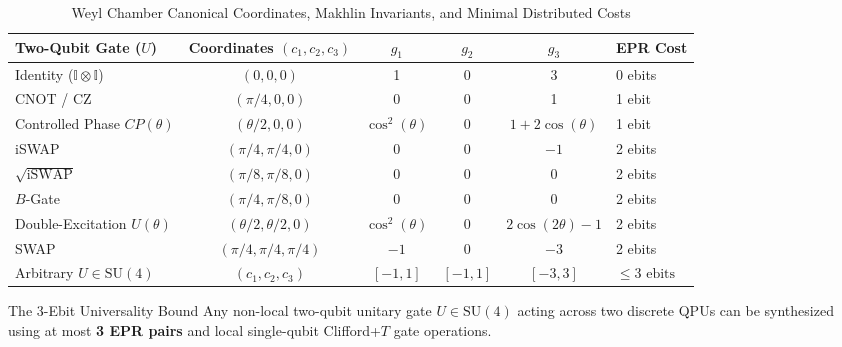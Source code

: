 \begin{table}[htbp]
\centering
\small
\caption{Weyl Chamber Canonical Coordinates, Makhlin Invariants, and Minimal Distributed Costs}
\label{tab:weyl_coordinates_cost}
\begin{tabularx}{\textwidth}{p{3.6cm} c c c c X}
\toprule
\textbf{Two-Qubit Gate ($U$)} & \textbf{Coordinates $(c_1, c_2, c_3)$} & \textbf{$g_1$} & \textbf{$g_2$} & \textbf{$g_3$} & \textbf{EPR Cost} \\
\midrule
Identity ($\mathbb{I} \otimes \mathbb{I}$) & $(0, 0, 0)$ & 1 & 0 & 3 & 0 ebits \\
CNOT / CZ & $(\pi/4, 0, 0)$ & 0 & 0 & 1 & 1 ebit \\
Controlled Phase $CP(\theta)$ & $(\theta/2, 0, 0)$ & $\cos^2(\theta)$ & 0 & $1 + 2\cos(\theta)$ & 1 ebit \\
iSWAP & $(\pi/4, \pi/4, 0)$ & 0 & 0 & $-1$ & 2 ebits \\
$\sqrt{\text{iSWAP}}$ & $(\pi/8, \pi/8, 0)$ & 0 & 0 & 0 & 2 ebits \\
$B$-Gate & $(\pi/4, \pi/8, 0)$ & 0 & 0 & 0 & 2 ebits \\
Double-Excitation $U(\theta)$ & $(\theta/2, \theta/2, 0)$ & $\cos^2(\theta)$ & 0 & $2\cos(2\theta)-1$ & 2 ebits \\
SWAP & $(\pi/4, \pi/4, \pi/4)$ & $-1$ & 0 & $-3$ & 2 ebits \\
Arbitrary $U \in \text{SU}(4)$ & $(c_1, c_2, c_3)$ & $[-1, 1]$ & $[-1, 1]$ & $[-3, 3]$ & $\le 3\text{ ebits}$ \\
\bottomrule
\end{tabularx}
\end{table}

\begin{theorembox}{The 3-Ebit Universality Bound}
Any non-local two-qubit unitary gate $U \in \text{SU}(4)$ acting across two discrete QPUs can be synthesized using at most \textbf{3 EPR pairs} and local single-qubit Clifford+$T$ gate operations.
\end{theorembox}

